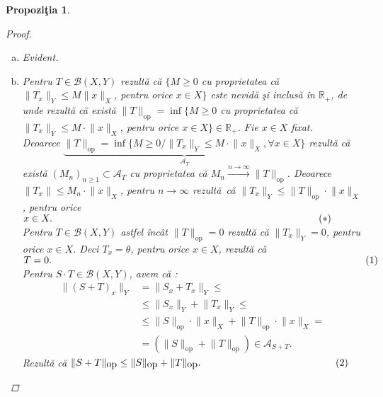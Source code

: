 \documentclass[ a4paper, 12pt]{report}
\newtheorem{prop}[theorem]{\bf Propozi\c tia }
\theoremstyle{definition}
\theoremstyle{remark}
\numberwithin{equation}{section}
\begin{document}
\begin{prop}
\begin{proof}
\begin{enumerate}[(a)]
\item Evident.
\item Pentru $T \in \mathcal{B}(X,Y)$ rezult\u a c\u a $\{ M \geq 0$ cu proprietatea c\u a \\ $\lVert T_x \rVert_{Y} \leq M \lVert x \rVert_{X}$, pentru orice $x \in X\}$ este nevid\u a \c si inclus\u a \^in $\mathbb{R}_{+}$, de unde rezult\u a c\u a exist\u a
$\lVert T \rVert_{\mbox{op}} = \inf\{M \geq 0$ cu proprietatea c\u a  $\lVert  T_x \rVert_{Y} \leq M \cdot \lVert x \rVert_{X}$, pentru orice $x \in X\} \in \mathbb{R}_{+}$.
Fie $x \in X$ fixat.\\
Deoarece $ \underbrace{\lVert T \rVert_{\mbox{op}} = \inf\{M \geq 0 / \lVert  T_x \rVert_{Y} \leq M \cdot \lVert x \rVert_{X}, \forall x \in X\}}_\text{$\mathcal{A}_{T}$}$ rezult\u a c\u a exist\u a $(M_n)_{n \geq 1} \subset \mathcal{A}_{T}$ cu proprietatea c\u a $M_n \stackrel{n \rightarrow \infty}{\longrightarrow} \lVert T \rVert_{\mbox{op}}$.
Deoarece $\lVert T_x \rVert \leq M_n \cdot \lVert x\rVert_{X}$, pentru $n \longrightarrow \infty$ rezult\u a\  c\u a $\lVert T_x \rVert_{Y} \leq \lVert T \rVert_{\mbox{op}} \cdot \lVert x  \rVert_{X}$, pentru orice $x \in X. \hspace{9.5cm}(\ast)$\\
Pentru $T \in \mathcal{B}(X,Y)$ astfel \^inc\^at $\lVert T \rVert_{\mbox{op}} = 0$ rezult\u a c\u a $\lVert T_x \rVert_{Y} = 0$, pentru orice $x \in X$. Deci $T_x = \theta$, pentru orice $x \in X$, rezult\u a c\u a \\
$T = 0.\hspace{11.2cm}  (1)$\\
Pentru $S \cdot T \in \mathcal{B}(X,Y)$, avem c\u a :\\
\begin{align*}
\lVert (S+T)_{x} \rVert_{Y} &= \lVert S_{x}+T_{x}  \rVert_{Y} \leq\\
&\leq \lVert S_x \rVert_{Y} + \lVert T_x \rVert_{Y} \leq\\
&\leq \lVert S  \rVert_{\mbox{op}} \cdot \lVert x \rVert_{X} + \lVert T \rVert_{\mbox{op}} \cdot \lVert x  \rVert_{X} =\\
&= (\lVert S \rVert_{\mbox{op}} + \lVert T \rVert_{\mbox{op}}) \in \mathcal{A}_{S+T}.
\end{align*}
Rezult\u a c\u a $\lVert S+T  \rVert_{\mbox{op}} \leq \lVert S \rVert_{\mbox{op}} + \lVert T \rVert_{\mbox{op}}. \hspace{4.8cm} (2)$ \\

\end{enumerate}
\end{proof}
\end{prop}
\end{document}
